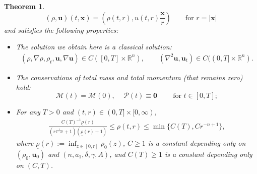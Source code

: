 \documentclass[11pt,reqno]{amsart}
\newtheorem{thm}{Theorem}[section]
\numberwithin{rk}{section}
\numberwithin{prop}{section}
\numberwithin{mydef}{section}
\numberwithin{lem}{section}
\numberwithin{equation}{section}
\numberwithin{thm}{section}
\begin{document}
\begin{thm}
\begin{equation}\label{2.8}
(\rho,\boldsymbol{u})(t,\boldsymbol{x})=(\rho(t,r),u(t,r)\frac{\boldsymbol{x}}{r}) \qquad\text{for $r=|\boldsymbol{x}|$}
\end{equation}
and satisfies the following properties{\rm:}
\begin{itemize}
\item[$\mathrm{(i)}$] The solution we obtain here 
is a classical solution{\rm :}
\begin{equation}\label{3dclassical2}
\begin{aligned}
(\rho,\nabla \rho, \rho_t, \boldsymbol{u},\nabla \boldsymbol{u})\in C([0,T]\times \mathbb{R}^n),\qquad ( \nabla^2 \boldsymbol{u},\boldsymbol{u}_t)\in C((0,T]\times \mathbb{R}^n).
\end{aligned}
\end{equation}
\item[$\mathrm{(ii)}$] The conservations of total mass and total momentum {\rm(}that remains zero{\rm)} hold{\rm :}
\begin{equation}\label{massconservation}
\mathcal{M}(t)=\mathcal{M}(0), \quad\, \mathcal{P}(t)\equiv \boldsymbol{0} \qquad \ 
\text{for $t\in [0,T]$};
\end{equation}
\item[$\mathrm{(iii)}$] For any $T>0$ and $(t,r)\in (0,T]\times [0,\infty)$,
\begin{equation}\label{decay-est}
\begin{gathered}
\frac{C(T)^{-1}\underline{\rho}(r)}{(r^{\frac{1}{2-2\delta}}+1)(\underline{\rho}(r)+1)}\leq \rho(t,r) \leq \min\big\{C(T),Cr^{-n+1}\big\},
\end{gathered}
\end{equation}
where $\underline{\rho}(r):=\inf_{z\in [0,r]} \rho_0(z)$,
$C\geq 1$ is a constant depending only on $(\rho_0,\boldsymbol{u}_0)$ and $(n,a_1,\delta,\gamma,A)$, and $C(T)\geq 1$ is a constant depending only on $(C,T)$. 
\end{itemize}
\end{thm}
\end{document}
